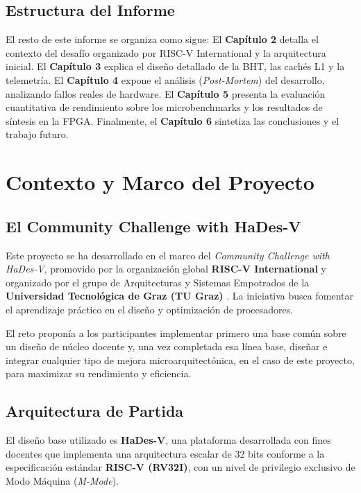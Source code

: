 \documentclass[10pt,a4paper]{article}
\begin{document}
\subsection{Estructura del Informe}
El resto de este informe se organiza como sigue: El \textbf{Capítulo 2} detalla el contexto del desafío organizado por RISC-V International y la arquitectura
inicial. El \textbf{Capítulo 3} explica el diseño detallado de la BHT, las cachés L1 y la telemetría. El \textbf{Capítulo 4} expone el análisis (\textit{Post-Mortem}) 
del desarrollo, analizando fallos reales de hardware. El \textbf{Capítulo 5} presenta la evaluación cuantitativa de rendimiento sobre los
microbenchmarks y los resultados de síntesis en la FPGA. Finalmente, el \textbf{Capítulo 6} sintetiza las conclusiones y el trabajo futuro.


\section{Contexto y Marco del Proyecto}

\subsection{El Community Challenge with HaDes-V}
Este proyecto se ha desarrollado en el marco del \textit{Community Challenge with HaDes-V}, promovido por la organización global \textbf{RISC-V International} y
organizado por el grupo de Arquitecturas y Sistemas Empotrados de la \textbf{Universidad Tecnológica de Graz (TU Graz)} \cite{scheipel2024}. La iniciativa busca 
fomentar el aprendizaje práctico en el diseño y optimización de procesadores.

El reto proponía a los participantes implementar primero una base común sobre un diseño de núcleo docente y, una vez completada esa línea base, diseñar e
integrar cualquier tipo de mejora microarquitectónica, en el caso de este proyecto, para maximizar su rendimiento y eficiencia.

\subsection{Arquitectura de Partida}
El diseño base utilizado es \textbf{HaDes-V}, una plataforma desarrollada con fines docentes que implementa una arquitectura escalar de 32 bits conforme a la
especificación estándar \textbf{RISC-V (RV32I)}, con un nivel de privilegio exclusivo de Modo Máquina (\textit{M-Mode}).
\end{document}
